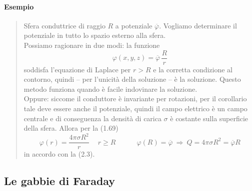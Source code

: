 \paragraph{Esempio}
\begin{quote}
  Sfera conduttrice di raggio $R$ a potenziale $\overline\varphi$. Vogliamo
  determinare il potenziale in tutto lo spazio esterno alla sfera.\\
  Possiamo ragionare in due modi: la funzione
  \begin{equation}
    \varphi(x,y,z)=\overline\varphi\,\frac Rr
    \tag{2.3}
  \end{equation}
  soddisfa l'equazione di Laplace per $r>R$ e la corretta condizione al
  contorno, quindi -- per l'unicit\`a della soluzione -- \`e la soluzione.
  Questo metodo funziona quando \`e facile indovinare la soluzione.\\
  Oppure: siccome il conduttore \`e invariante per rotazioni, per il corollario
  tale deve essere anche il potenziale, quindi il campo elettrico \`e un campo
  centrale e di conseguenza la densit\`a di carica $\sigma$ \`e costante sulla
  superficie della sfera. Allora per la (1.69)
  \begin{equation}
    \varphi(r)=\frac{4\pi\sigma R^2}{r}
    \quad\ r\ge R\qquad\quad\varphi(R)=\overline\varphi
    \ \Rightarrow\ Q=4\pi\sigma R^2=\overline\varphi R
    \tag{2.4}
  \end{equation}
  in accordo con la (2.3).
\end{quote}

\subsection{Le gabbie di Faraday}

